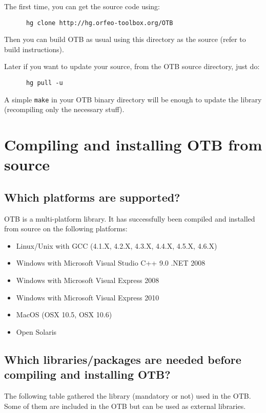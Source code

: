 The first time, you can get the source code using:
\begin{verbatim}
      hg clone http://hg.orfeo-toolbox.org/OTB
\end{verbatim}

Then you can build OTB as usual using this directory as the source (refer to build instructions).

Later if you want to update your source, from the OTB source directory, just do:
\begin{verbatim}
      hg pull -u
\end{verbatim}

A simple \texttt{make} in your OTB binary directory will be enough to update the library (recompiling only the necessary stuff).


\section{Compiling and installing OTB from source}
\label{sec:FAQInstall}
\subsection{Which platforms are supported?}
OTB is a multi-platform library. It has successfully been  compiled and installed from source on
the following platforms:
\begin{itemize}
  \item Linux/Unix with GCC (4.1.X, 4.2.X, 4.3.X, 4.4.X, 4.5.X, 4.6.X)
  \item Windows with Microsoft Visual Studio C++ 9.0 .NET 2008
  \item Windows with Microsoft Visual Express 2008
  \item Windows with Microsoft Visual Express 2010
  \item MacOS (OSX 10.5, OSX 10.6)
  \item Open Solaris
\end{itemize}

\subsection{Which libraries/packages are needed before compiling and installing
 OTB?}
The following table gathered the library (mandatory or not) used in the OTB. Some of them are included in the OTB but can be used as external libraries.

